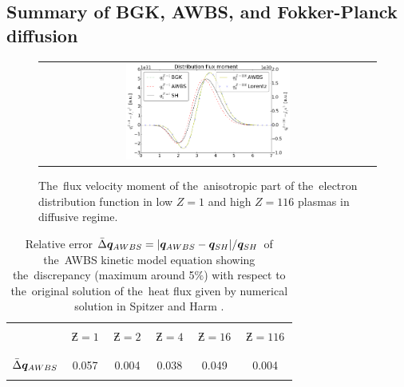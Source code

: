 
\subsection{Summary of BGK, AWBS, and Fokker-Planck diffusion}
\label{sec:SummaryDiffusiveKinetics}

\begin{figure}[tbh]
  \begin{center}
    \begin{tabular}{c}
      \includegraphics[width=0.5\textwidth]{q1s.png}
    \end{tabular}
  \caption{  
  The~flux velocity moment of the~anisotropic part of the~electron distribution 
  function in low $Z=1$ and high $Z=116$ plasmas in diffusive regime.}
  \end{center}
  \label{fig:q1s_summary}
\end{figure}

\begin{table}
\begin{center}
  \begin{tabular}{c|ccccc}
    \hline\hline\\
    & $\,\Zbar=1\,$ & $\,\Zbar=2\,$ & $\,\Zbar=4\,$ & $\,\Zbar=16\,$ & $\,\Zbar=116\,$ \\\\
    \hline\\
    $\bar{\Delta}\boldsymbol{q}_{AWBS}$ & 0.057 & 0.004 & 0.038 & 0.049 & 0.004 \\\\
    \hline\hline
  \end{tabular}
  \caption{
  Relative error $\bar{\Delta}\boldsymbol{q}_{AWBS} = 
  |\boldsymbol{q}_{AWBS} - \boldsymbol{q}_{SH}| / \boldsymbol{q}_{SH}$ of the~AWBS
  kinetic model equation  showing the~discrepancy 
  (maximum around 5$\%$) with respect to the~original solution of 
  the~heat flux given by numerical solution in Spitzer and Harm 
  \cite{SpitzerHarm_PR1953}.
  }
\end{center}
\label{tab:qAWBS}
\end{table}

